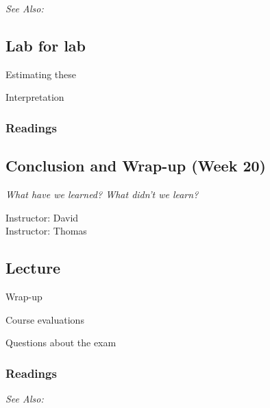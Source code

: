 \documentclass[11pt,a4paper]{article}
\newcommand{\thomas}{\vspace{1em}\noindent Instructor: Thomas\vspace{1em}\\}
\newcommand{\david}{\vspace{1em}\noindent Instructor: David\vspace{1em}\\}
\newcommand{\seealso}{\noindent \emph{See Also:}\\}
\begin{document}
\seealso


\subsection*{Lab for lab}

\begin{itemize*}
\item Estimating these
\item Interpretation
\end{itemize*}

\subsubsection*{Readings}




\clearpage
\subsection{Conclusion and Wrap-up (Week 20)} %
\emph{What have we learned? What didn't we learn?}

\david
\thomas

\vspace{1em}
\subsection*{Lecture}
\begin{itemize*}
\item Wrap-up
\item Course evaluations
\item Questions about the exam
\end{itemize*}

\subsubsection*{Readings}

\seealso






\end{document}

